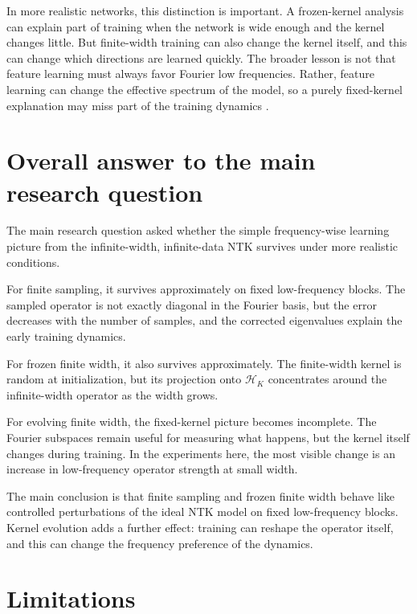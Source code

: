 In more realistic networks, this distinction is important. A frozen-kernel
analysis can explain part of training when the network is wide enough and the
kernel changes little. But finite-width training can also change the kernel
itself, and this can change which directions are learned quickly. The broader
lesson is not that feature learning must always favor Fourier low frequencies.
Rather, feature learning can change the effective spectrum of the model, so a
purely fixed-kernel explanation may miss part of the training dynamics
\citep{bordelon2023dynamicsfinitewidthkernel,
	vyas2022limitationsntkunderstandinggeneralization}.

\section{Overall answer to the main research question}
\label{sec:discussion-main-question}

The main research question asked whether the simple frequency-wise learning
picture from the infinite-width, infinite-data NTK survives under more realistic
conditions.

For finite sampling, it survives approximately on fixed low-frequency blocks.
The sampled operator is not exactly diagonal in the Fourier basis, but the error
decreases with the number of samples, and the corrected eigenvalues explain the
early training dynamics.

For frozen finite width, it also survives approximately. The finite-width kernel
is random at initialization, but its projection onto \(\mathcal H_K\)
concentrates around the infinite-width operator as the width grows.

For evolving finite width, the fixed-kernel picture becomes incomplete. The
Fourier subspaces remain useful for measuring what happens, but the kernel
itself changes during training. In the experiments here, the most visible change
is an increase in low-frequency operator strength at small width.

The main conclusion is that finite sampling and frozen finite width behave like
controlled perturbations of the ideal NTK model on fixed low-frequency blocks.
Kernel evolution adds a further effect: training can reshape the operator
itself, and this can change the frequency preference of the dynamics.

\section{Limitations}
\label{sec:discussion-limitations}


